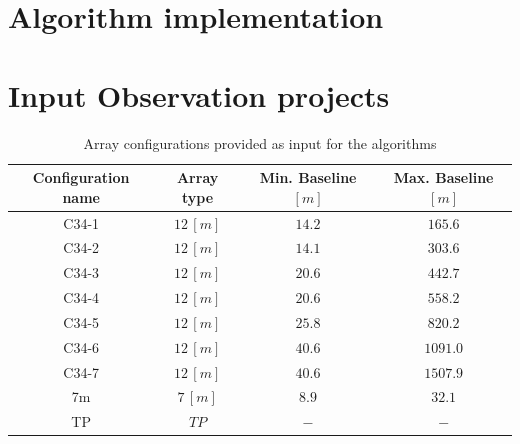 \section {Algorithm implementation}

\section {Input Observation projects}

\begin{table}
\label{table:input-array-configs}
\begin{center}
\begin{tabular}{|c|c|c|c|}
\hline
Configuration name & Array type & Min. Baseline $[m]$ & Max. Baseline $[m]$\\
\hline
C34-1 & $12\,[m]$ & $14.2$ & $165.6$ \\
\hline
C34-2 & $12\,[m]$ & $14.1$ & $303.6$ \\
\hline
C34-3 & $12\,[m]$ & $20.6$ & $442.7$ \\
\hline
C34-4 & $12\,[m]$ & $20.6$ & $558.2$ \\
\hline
C34-5 & $12\,[m]$ & $25.8$ & $820.2$ \\
\hline
C34-6 & $12\,[m]$ & $40.6$ & $1091.0$ \\
\hline
C34-7 & $12\,[m]$ & $40.6$ & $1507.9$ \\
\hline
7m    & $7\,[m]$  & $8.9$  & $32.1$ \\
\hline
TP    & $TP$      & $-$    & $-$ \\
\hline
\end{tabular}
\end{center}
\caption{Array configurations provided as input for the algorithms}
\end{table}

